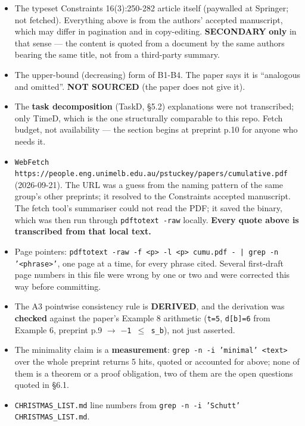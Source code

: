 \documentclass[10pt,a4paper]{article}
\newcommand{\provtag}[2]{{\small\sffamily\bfseries\textcolor{#1}{#2}}}
\newenvironment{pubblock}{%
  \par\smallskip
  \def\FrameCommand{\textcolor{litbar}{\vrule width 2.5pt}\hspace{9pt}}%
  \MakeFramed{\advance\hsize-\width\FrameRestore}}%
  {\endMakeFramed\par\smallskip}
\newcommand{\litsub}[1]{\par\smallskip{\sffamily\bfseries\textcolor{litbar}{#1}\par}}
\begin{document}
\begin{pubblock}
\par\smallskip
\litsub{What was not sourced \ \provtag{tagnotsourced}{NOT SOURCED}}
\begin{itemize}\setlength{\itemsep}{0pt}
\item The typeset Constraints 16(3):250-282 article itself (paywalled at Springer; not fetched). Everything above is from the authors' accepted manuscript, which may differ in pagination and in copy-editing. \provtag{tagsecondary}{SECONDARY} \textbf{only} in that sense --- the content is quoted from a document by the same authors bearing the same title, not from a third-party summary.
\item The upper-bound (decreasing) form of B1-B4. The paper says it is ``analogous and omitted''. \provtag{tagnotsourced}{NOT SOURCED} (the paper does not give it).
\item The \textbf{task decomposition} (TaskD, \S{}5.2) explanations were not transcribed; only TimeD, which is the one structurally comparable to this repo. Fetch budget, not availability --- the section begins at preprint p.10 for anyone who needs it.
\end{itemize}
\par\smallskip
\litsub{How the source file was produced}
{\small
\begin{itemize}\setlength{\itemsep}{0pt}
\item \texttt{WebFetch https:/\allowbreak{}/\allowbreak{}people.\allowbreak{}eng.\allowbreak{}unimelb.\allowbreak{}edu.\allowbreak{}au/\allowbreak{}pstuckey/\allowbreak{}papers/\allowbreak{}cumulative.\allowbreak{}pdf} (2026-09-21). The URL was a guess from the naming pattern of the same group's other preprints; it resolved to the Constraints accepted manuscript. The fetch tool's summariser could not read the PDF; it saved the binary, which was then run through \texttt{pdftotext -raw} locally. \textbf{Every quote above is transcribed from that local text.}
\item Page pointers: \texttt{pdftotext -\allowbreak{}raw -\allowbreak{}f <p> -\allowbreak{}l <p> cumu.\allowbreak{}pdf -\allowbreak{} | grep -\allowbreak{}n '<phrase>'}, one page at a time, for every phrase cited. Several first-draft page numbers in this file were wrong by one or two and were corrected this way before committing.
\item The A3 pointwise consistency rule is \provtag{tagderived}{DERIVED}, and the derivation was \textbf{checked} against the paper's Example 8 arithmetic (\texttt{t=5}, \texttt{d[b]=6} from Example 6, preprint p.9 $\rightarrow$ \texttt{$-$1 $\leq$ s\_b}), not just asserted.
\item The minimality claim is a \textbf{measurement}: \texttt{grep -\allowbreak{}n -\allowbreak{}i 'minimal' <text>} over the whole preprint returns 5 hits, quoted or accounted for above; none of them is a theorem or a proof obligation, two of them are the open questions quoted in \S{}6.1.
\item \texttt{CHRISTMAS\_LIST.md} line numbers from \texttt{grep -\allowbreak{}n -\allowbreak{}i 'Schutt' CHRISTMAS\_\allowbreak{}LIST.\allowbreak{}md}.
\end{itemize}
\par}
\end{pubblock}
\end{document}
